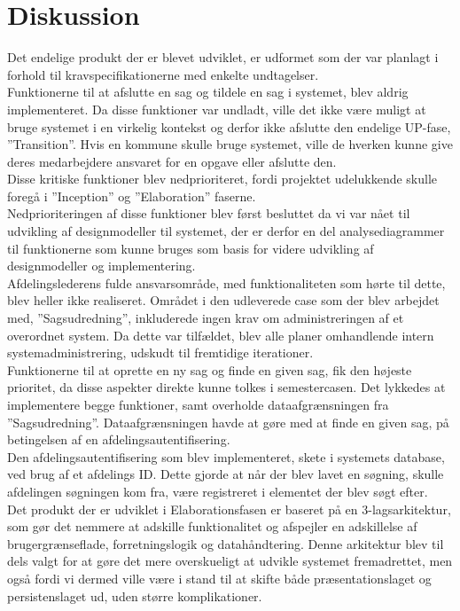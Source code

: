\chapter{Diskussion}
Det endelige produkt der er blevet udviklet, er udformet som der var planlagt i forhold til kravspecifikationerne med enkelte undtagelser. \\
Funktionerne til at afslutte en sag og tildele en sag i systemet, blev aldrig implementeret. Da disse funktioner var undladt, ville det ikke være muligt at bruge systemet i en virkelig kontekst og derfor ikke afslutte den endelige UP-fase, ”Transition”. Hvis en kommune skulle bruge systemet, ville de hverken kunne give deres medarbejdere ansvaret for en opgave eller afslutte den. \\
Disse kritiske funktioner blev nedprioriteret, fordi projektet udelukkende skulle foregå i ”Inception” og ”Elaboration” faserne.\\
Nedprioriteringen af disse funktioner blev først besluttet da vi var nået til udvikling af designmodeller til systemet, der er derfor en del analysediagrammer til funktionerne som kunne bruges som basis for videre udvikling af designmodeller og implementering.\\
Afdelingslederens fulde ansvarsområde, med funktionaliteten som hørte til dette, blev heller ikke realiseret. Området i den udleverede case som der blev arbejdet med, ”Sagsudredning”, inkluderede ingen krav om administreringen af et overordnet system. Da dette var tilfældet, blev alle planer omhandlende intern systemadministrering, udskudt til fremtidige iterationer.\\
Funktionerne til at oprette en ny sag og finde en given sag, fik den højeste prioritet, da disse aspekter direkte kunne tolkes i semestercasen. Det lykkedes at implementere begge funktioner, samt overholde dataafgrænsningen fra ”Sagsudredning”. Dataafgrænsningen havde at gøre med at finde en given sag, på betingelsen af en afdelingsautentifisering. \\
Den afdelingsautentifisering som blev implementeret, skete i systemets database, ved brug af et afdelings ID. Dette gjorde at når der blev lavet en søgning, skulle afdelingen søgningen kom fra, være registreret i elementet der blev søgt efter.\\
Det produkt der er udviklet i Elaborationsfasen er baseret på en 3-lagsarkitektur, som gør det nemmere at adskille funktionalitet og afspejler en adskillelse af brugergrænseflade, forretningslogik og datahåndtering. Denne arkitektur blev til dels valgt for at gøre det mere overskueligt at udvikle systemet fremadrettet, men også fordi vi dermed ville være i stand til at skifte både præsentationslaget og persistenslaget ud, uden større komplikationer. \\
